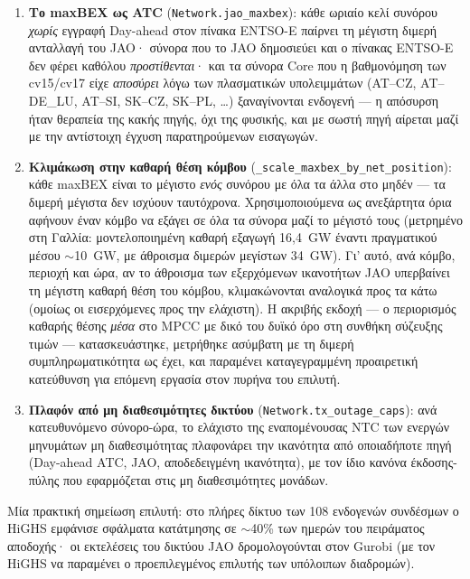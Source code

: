 \begin{enumerate}
\item \textbf{Το maxBEX ως ATC} (\texttt{Network.jao\_maxbex}): κάθε ωριαίο κελί συνόρου \emph{χωρίς} εγγραφή Day-ahead στον πίνακα ENTSO-E παίρνει τη μέγιστη διμερή ανταλλαγή του JAO· σύνορα που το JAO δημοσιεύει και ο πίνακας ENTSO-E δεν φέρει καθόλου \emph{προστίθενται}· και τα σύνορα Core που η βαθμονόμηση των cv15/cv17 είχε \emph{αποσύρει} λόγω των πλασματικών υπολειμμάτων (AT--CZ, AT--DE\_LU, AT--SI, SK--CZ, SK--PL, \ldots) ξαναγίνονται ενδογενή --- η απόσυρση ήταν θεραπεία της κακής πηγής, όχι της φυσικής, και με σωστή πηγή αίρεται μαζί με την αντίστοιχη έγχυση παρατηρούμενων εισαγωγών.
\item \textbf{Κλιμάκωση στην καθαρή θέση κόμβου} (\texttt{\_scale\_maxbex\_by\_net\_position}): κάθε maxBEX είναι το μέγιστο \emph{ενός} συνόρου με όλα τα άλλα στο μηδέν --- τα διμερή μέγιστα δεν ισχύουν ταυτόχρονα. Χρησιμοποιούμενα ως ανεξάρτητα όρια αφήνουν έναν κόμβο να εξάγει σε όλα τα σύνορα μαζί το μέγιστό τους (μετρημένο στη Γαλλία: μοντελοποιημένη καθαρή εξαγωγή 16,4~GW έναντι πραγματικού μέσου $\sim$10~GW, με άθροισμα διμερών μεγίστων 34~GW). Γι' αυτό, ανά κόμβο, περιοχή και ώρα, αν το άθροισμα των εξερχόμενων ικανοτήτων JAO υπερβαίνει τη μέγιστη καθαρή θέση του κόμβου, κλιμακώνονται αναλογικά προς τα κάτω (ομοίως οι εισερχόμενες προς την ελάχιστη). Η ακριβής εκδοχή --- ο περιορισμός καθαρής θέσης \emph{μέσα} στο MPCC με δικό του δυϊκό όρο στη συνθήκη σύζευξης τιμών --- κατασκευάστηκε, μετρήθηκε ασύμβατη με τη διμερή συμπληρωματικότητα ως έχει, και παραμένει καταγεγραμμένη προαιρετική κατεύθυνση για επόμενη εργασία στον πυρήνα του επιλυτή.
\item \textbf{Πλαφόν από μη διαθεσιμότητες δικτύου} (\texttt{Network.tx\_outage\_caps}): ανά κατευθυνόμενο σύνορο-ώρα, το ελάχιστο της εναπομένουσας NTC των ενεργών μηνυμάτων μη διαθεσιμότητας πλαφονάρει την ικανότητα από οποιαδήποτε πηγή (Day-ahead ATC, JAO, αποδεδειγμένη ικανότητα), με τον ίδιο κανόνα έκδοσης-πύλης που εφαρμόζεται στις μη διαθεσιμότητες μονάδων.
\end{enumerate}

Μία πρακτική σημείωση επιλυτή: στο πλήρες δίκτυο των 108 ενδογενών συνδέσμων ο HiGHS εμφάνισε σφάλματα κατάτμησης σε $\sim$40\% των ημερών του πειράματος αποδοχής· οι εκτελέσεις του δικτύου JAO δρομολογούνται στον Gurobi (με τον HiGHS να παραμένει ο προεπιλεγμένος επιλυτής των υπόλοιπων διαδρομών).


